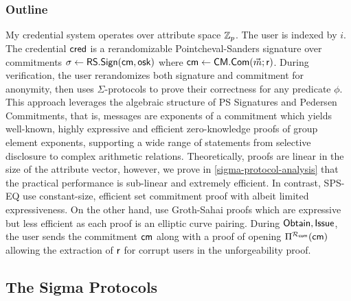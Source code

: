 \subsubsection{Outline}
My credential system operates over attribute space $\mathbb{Z}_p$. The user is indexed by $i$. The credential $\mathsf{cred}$ is a rerandomizable Pointcheval-Sanders signature over commitments $\sigma \gets \mathsf{RS.Sign}(\mathsf{cm}, \mathsf{osk})$ where $\mathsf{cm} \gets \mathsf{CM.Com}(\vec{m}; \mathsf{r})$. During verification, the user rerandomizes both signature and commitment for anonymity, then uses $\Sigma$-protocols to prove their correctness for any predicate $\phi$. This approach leverages the algebraic structure of PS Signatures and Pedersen Commitments, that is, messages are exponents of a commitment which yields well-known, highly expressive and efficient zero-knowledge proofs of group element exponents, supporting a wide range of statements from selective disclosure to complex arithmetic relations. Theoretically, proofs are linear in the size of the attribute vector, however, we prove in \ref{sigma-protocol-analysis} that the practical performance is sub-linear and extremely efficient. In contrast, SPS-EQ \cite{fuchsbauer_structure-preserving_2019, hanaoka_improved_2022} use constant-size, efficient set commitment proof with albeit limited expressiveness. On the other hand, \cite{rabaninejad_attribute-based_2024} use Groth-Sahai proofs which are expressive but less efficient as each proof is an elliptic curve pairing. During $\mathsf{Obtain}, \mathsf{Issue}$, the user sends the commitment $\mathsf{cm}$ along with a proof of opening $\Pi^{\mathcal{R}_{\mathsf{com}}}(\mathsf{cm})$ allowing the extraction of $\mathsf{r}$ for corrupt users in the unforgeability proof.



\subsection{The Sigma Protocols}

